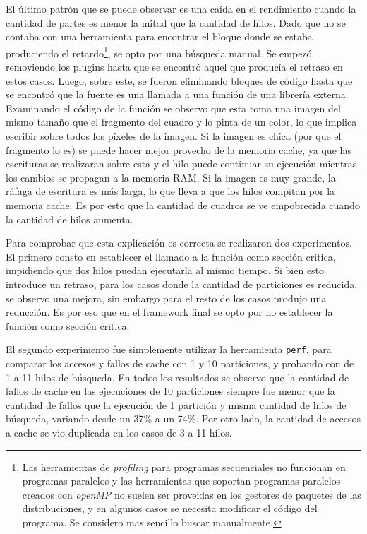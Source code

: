 El último patrón que se puede observar es una caída en el rendimiento cuando la
cantidad de partes es menor la mitad que la cantidad de hilos. Dado que no se
contaba con una herramienta para encontrar el bloque donde se estaba produciendo
el retardo\footnote{Las herramientas de \emph{profiling} para programas
secuenciales no funcionan en programas paralelos y las herramientas que soportan
programas paralelos creados con \emph{openMP} no suelen ser proveidas en los
gestores de paquetes de las distribuciones, y en algunos casos se necesita
modificar el código del programa. Se considero mas sencillo buscar
manualmente.}, se opto por una búsqueda manual. Se empezó removiendo los
plugins hasta que se encontró aquel que producía el retraso en estos casos.
Luego, sobre este, se fueron eliminando bloques de código hasta que se encontró
que la fuente es una llamada a una función de una librería externa. Examinando
el código de la función se observo que esta toma una imagen del mismo tamaño que
el fragmento del cuadro y lo pinta de un color, lo que implica escribir sobre
todos los píxeles de la imagen. Si la imagen es chica (por que el fragmento lo
es) se puede hacer mejor provecho de la memoria cache, ya que las escrituras se
realizaran sobre esta y el hilo puede continuar su ejecución mientras los
cambios se propagan a la memoria RAM. Si la imagen es muy grande, la ráfaga de
escritura es más larga, lo que lleva a que los hilos compitan por la memoria
cache. Es por esto que la cantidad de cuadros se ve empobrecida cuando la
cantidad de hilos aumenta.

Para comprobar que esta explicación es correcta se realizaron dos experimentos.
El primero consto en establecer el llamado a la función como sección critica,
impidiendo que dos hilos puedan ejecutarla al mismo tiempo. Si bien esto
introduce un retraso, para los casos donde la cantidad de particiones es
reducida, se observo una mejora, sin embargo para el resto de los casos produjo
una reducción. Es por eso que en el framework final se opto por no
establecer la función como sección critica.

El segundo experimento fue simplemente utilizar la herramienta \texttt{perf},
para comparar los accesos y fallos de cache con 1 y 10 particiones, y probando
con de 1 a 11 hilos de búsqueda. En todos los resultados se observo que la
cantidad de fallos de cache en las ejecuciones de 10 particiones siempre fue
menor que la cantidad de fallos que la ejecución de 1 partición y misma cantidad
de hilos de búsqueda, variando desde un 37\% a un 74\%. Por otro lado, la
cantidad de accesos a cache se vio duplicada en los casos de 3 a 11 hilos.

